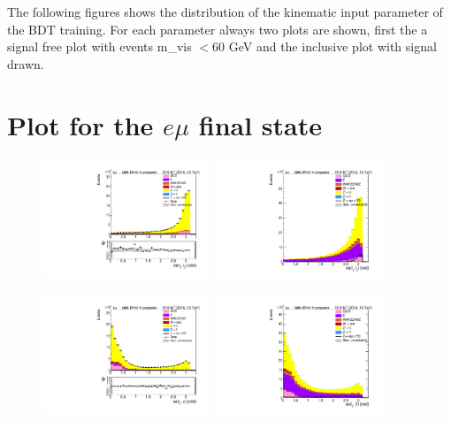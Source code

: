 \label{sec:appendix_A}

The following figures shows the distribution of the kinematic input parameter of the \gls{BDT} training. For each parameter always two plots are shown, first the a signal free plot with events \gls{m_vis} $< 60$ GeV and the inclusive plot with signal drawn. 

\section*{Plot for the $e\mu$ final state}

\begin{figure}[htp]
	\includegraphics[width=0.45\textwidth]{plots/em/DeltaPhiL1L2_CR.pdf}
	\includegraphics[width=0.45\textwidth]{plots/em/DeltaPhiL1L2_withsignal.pdf}

	\includegraphics[width=0.45\textwidth]{plots/em/DeltaPhiL1Z_CR.pdf}
	\includegraphics[width=0.45\textwidth]{plots/em/DeltaPhiL1Z_withsignal.pdf}

\end{figure}


